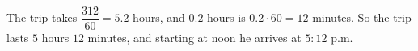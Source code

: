 The trip takes $\dfrac{312}{60}=5.2$ hours, and $0.2$ hours is $0.2\cdot60=12$ minutes. So the trip lasts $5$ hours $12$ minutes, and starting at noon he arrives at $\boxed{5{:}12\text{ p.m.}}$
